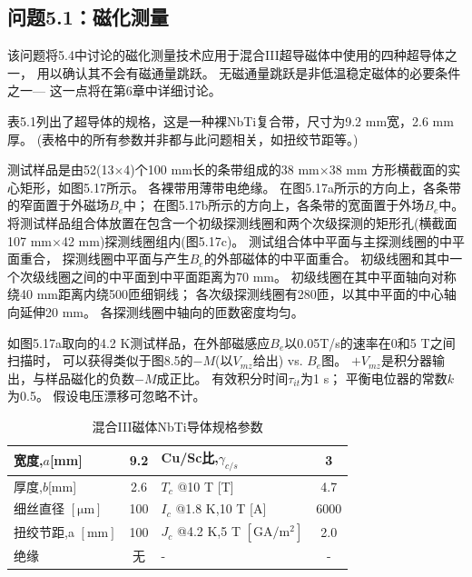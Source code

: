 \subsection{问题5.1：磁化测量}
该问题将5.4中讨论的磁化测量技术应用于混合III超导磁体中使用的四种超导体之一，
用以确认其不会有磁通量跳跃。
无磁通量跳跃是非低温稳定磁体的必要条件之一--- 这一点将在第6章中详细讨论。

表5.1列出了超导体的规格，这是一种裸NbTi复合带，尺寸为9.2 mm宽，2.6 mm厚。
(表格中的所有参数并非都与此问题相关，如扭绞节距等。)

测试样品是由52(13$\times$4)个100 mm长的条带组成的38 mm$\times$38 mm 方形横截面的实心矩形，如图5.17所示。
各裸带用薄带电绝缘。
在图5.17a所示的方向上，各条带的窄面置于外磁场$B_e$中；
在图5.17b所示的方向上，各条带的宽面置于外场$B_e$中。
将测试样品组合体放置在包含一个初级探测线圈和两个次级探测的矩形孔(横截面107 mm$\times$42 mm)探测线圈组内(图5.17c)。
测试组合体中平面与主探测线圈的中平面重合，
探测线圈中平面与产生$B_e$的外部磁体的中平面重合。
初级线圈和其中一个次级线圈之间的中平面到中平面距离为70 mm。
初级线圈在其中平面轴向对称绕40 mm距离内绕500匝细铜线；
各次级探测线圈有280匝，以其中平面的中心轴向延伸20 mm。
各探测线圈中轴向的匝数密度均匀。

如图5.17a取向的4.2 K测试样品，在外部磁感应$B_e$以0.05T/s的速率在0和5 T之间扫描时，
可以获得类似于图8.5的$-M$(以$V_{mz}$给出) vs. $B_e$图。
$+V_{mz}$是积分器输出，与样品磁化的负数$-M$成正比。
有效积分时间$\tau_{it}$为1 s；
平衡电位器的常数$k$为0.5。
假设电压漂移可忽略不计。

\begin{table}[htbp]\small
\centering
\caption{混合III磁体NbTi导体规格参数} 
\begin{tabular}{|l|c||l|c|}
\hline
宽度,$a$[mm] & 9.2 & Cu/Sc比,$\gamma_{c/s}$ & 3 \\ \hline
厚度,$b$[mm] & 2.6 & $T_c$ @10 T [T] & 4.7 \\ \hline
细丝直径 $[\mathrm{\mu m}]$ & 100 & $I_c$ @1.8 K,10 T [A] & 6000 \\ \hline
扭绞节距,a $\left[\mathrm{mm}\right]$ & 100 & $J_c$ @4.2 K,5 T $\left[\mathrm{GA/m^2}\right]$ & 2.0 \\ \hline
绝缘& 无 & - & - \\ \hline
\end{tabular}
\end{table}


